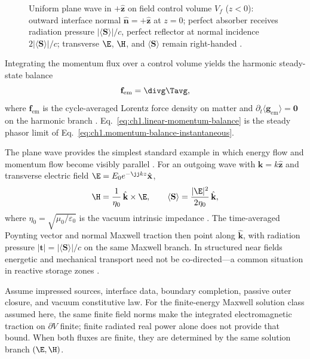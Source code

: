 \begin{figure}[t]
\centering
\VolIPhysFig{\VolIPhysPlaneWaveRadiationPressure}
\caption{Uniform plane wave in $+\hat{\mathbf{z}}$ on field control volume $V_f$ ($z<0$): outward interface normal $\hat{\mathbf{n}}=+\hat{\mathbf{z}}$ at $z=0$; perfect absorber receives radiation pressure $|\langle\mathbf{S}\rangle|/c$, perfect reflector at normal incidence $2|\langle\mathbf{S}\rangle|/c$; transverse $\E$, $\H$, and $\langle\mathbf{S}\rangle$ remain right-handed \cite{stratton1941,maxwell1873}.}
\label{fig:ch1.plane-wave-handedness}
\end{figure}
Integrating the momentum flux over a control volume yields the harmonic steady-state balance
\begin{equation}
\label{eq:ch1.linear-momentum-balance}
\mathbf{f}_{\mathrm{em}}=\divg\Tavg,
\end{equation}
where \(\mathbf{f}_{\mathrm{em}}\) is the cycle-averaged Lorentz force density on matter and \(\partial_t\langle\mathbf{g}_{\mathrm{em}}\rangle=\mathbf{0}\) on the harmonic branch \cite{stratton1941}. Eq.~\eqref{eq:ch1.linear-momentum-balance} is the steady phasor limit of Eq.~\eqref{eq:ch1.momentum-balance-instantaneous}.

\label{eq:ch1.energy-momentum-directional-ratio}
The plane wave provides the simplest standard example in which energy flow and momentum flow become visibly parallel \cite{poynting1884,stratton1941}. For an outgoing wave with $\mathbf{k}=k\hat{\mathbf{z}}$ and transverse electric field $\E=E_0 e^{-\jj k z}\hat{\mathbf{x}}$,
\begin{equation}
\label{eq:ch1.plane-wave-transverse}
\H=\frac{1}{\eta_0}\,\hat{\mathbf{k}}\times\E,
\qquad
\langle\mathbf{S}\rangle=\frac{|\E|^{2}}{2\eta_0}\,\hat{\mathbf{k}},
\end{equation}
where $\eta_0=\sqrt{\mu_0/\varepsilon_0}$ is the vacuum intrinsic impedance \cite{stratton1941}. The time-averaged Poynting vector and normal Maxwell traction then point along $\hat{\mathbf{k}}$, with radiation pressure $|\mathbf{t}|=|\langle\mathbf{S}\rangle|/c$ on the same Maxwell branch. In structured near fields energetic and mechanical transport need not be co-directed---a common situation in reactive storage zones \cite{stratton1941}.

\label{prop:ch1.energy-momentum-consistency}
Assume impressed sources, interface data, boundary completion, passive outer
closure, and vacuum constitutive law. For the finite-energy Maxwell solution class assumed here, the same finite field norms make the integrated electromagnetic traction on \(\partial V\) finite; finite radiated real power alone does not provide that bound. When both fluxes are finite, they are determined by the same solution branch \((\E,\H)\).

